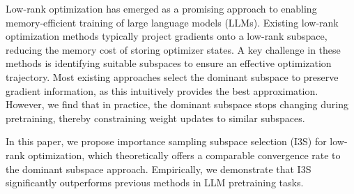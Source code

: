 Low-rank optimization has emerged as a promising approach to enabling memory-efficient training of large language models (LLMs). Existing low-rank optimization methods typically project gradients onto a low-rank subspace, reducing the memory cost of storing optimizer states. A key challenge in these methods is identifying suitable subspaces to ensure an effective optimization trajectory. Most existing approaches select the dominant subspace to preserve gradient information, as this intuitively provides the best approximation. However, we find that in practice, the dominant subspace stops changing during pretraining, thereby constraining weight updates to similar subspaces.

In this paper, we propose importance sampling subspace selection (I3S) for low-rank optimization, which theoretically offers a comparable convergence rate to the dominant subspace approach. Empirically, we demonstrate that I3S significantly outperforms previous methods in LLM pretraining tasks.
